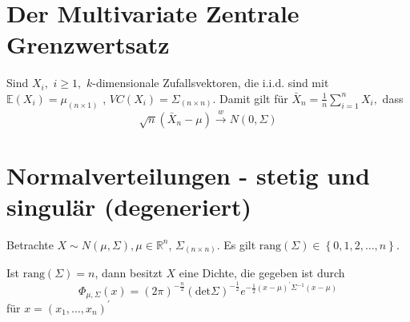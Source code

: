 \documentclass{tstextbook}
\begin{document}
\section{Der Multivariate Zentrale Grenzwertsatz}



\begin{satz}
	
	Sind $ X_i,$  $ i\ge 1, $  $ k $-dimensionale Zufallsvektoren, die i.i.d. sind mit $ \mathbb{E}(X_i)=\mu_{(n \times 1)} $  , $ VC(X_i) = \Sigma_{(n \times n)}. $
	Damit gilt für $ \bar{X}_n = \frac{1}{n} \sum_{i=1}^{n} X_i,$  dass 
	\[  \sqrt{n}(\bar{X}_n-\mu) \overset{w}{\longrightarrow} N(0, \Sigma) \]
\end{satz}


\section{Normalverteilungen - stetig und singulär (degeneriert)}


Betrachte $ X \sim N(\mu, \Sigma),\mu \in \mathbb{R}^n $, $ \Sigma_{(n\times n)} $. Es gilt $ \text{rang}(\Sigma)\in \left\lbrace 0, 1, 2,\ldots, n\right\rbrace  $.

\begin{theorem}
	
	Ist $ \text{rang}(\Sigma)=n $, dann besitzt $ X $  eine Dichte, die gegeben ist durch
	\[ \Phi_{\mu, \Sigma} (x) = (2\pi)^{-\frac{n}{2}} (\text{det} \Sigma)^{-\frac{1}{2}} e^{-\frac{1}{2}(x-\mu)^\prime\Sigma^{-1}(x-\mu)} \] für $ x = \left( x_1,\ldots, x_n \right)^{\prime} $
\end{theorem}
\end{document}
